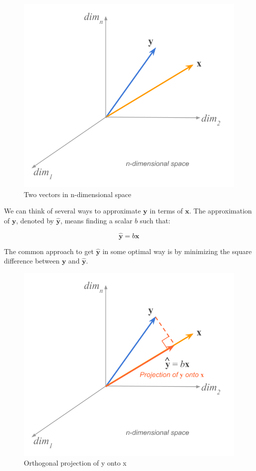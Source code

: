 \documentclass[]{book}
\begin{document}
\begin{figure}

{\centering \includegraphics[width=0.6\linewidth]{images/duality/vector-projection0} 

}

\caption{Two vectors in n-dimensional space}\label{fig:unnamed-chunk-18}
\end{figure}

We can think of several ways to approximate \(\mathbf{y}\) in terms of
\(\mathbf{x}\). The approximation of \(\mathbf{y}\), denoted by \(\mathbf{\hat{y}}\),
means finding a scalar \(b\) such that:

\[
\mathbf{\hat{y}} = b \mathbf{x}
\]

The common approach to get \(\mathbf{\hat{y}}\) in some optimal way is by
minimizing the square difference between \(\mathbf{y}\) and \(\mathbf{\hat{y}}\).

\begin{figure}

{\centering \includegraphics[width=0.6\linewidth]{images/duality/vector-projection1} 

}

\caption{Orthogonal projection of y onto x}\label{fig:unnamed-chunk-19}
\end{figure}
\end{document}
